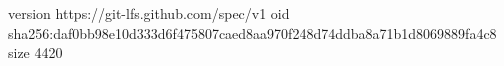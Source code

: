version https://git-lfs.github.com/spec/v1
oid sha256:daf0bb98e10d333d6f475807caed8aa970f248d74ddba8a71b1d8069889fa4c8
size 4420
